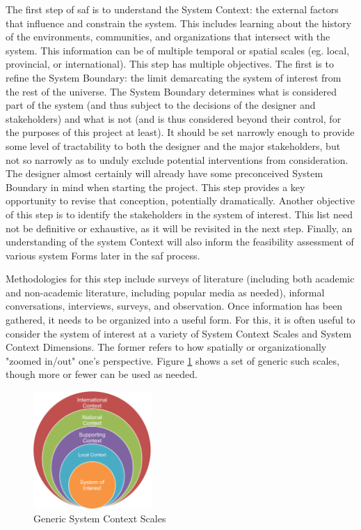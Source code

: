The first step of \ac{saf} is to understand the System Context: the external factors that influence and constrain the system. This includes learning about the history of the environments, communities, and organizations that intersect with the system. This information can be of multiple temporal or spatial scales (eg. local, provincial, or international). This step has multiple objectives. The first is to refine the System Boundary: the limit demarcating the system of interest from the rest of the universe. The System Boundary determines what is considered part of the system (and thus subject to the decisions of the designer and stakeholders) and what is not (and is thus considered beyond their control, for the purposes of this project at least). It should be set narrowly enough to provide some level of tractability to both the designer and the major stakeholders, but not so narrowly as to unduly exclude potential interventions from consideration. The designer almost certainly will already have some preconceived System Boundary in mind when starting the project. This step provides a key opportunity to revise that conception, potentially dramatically. Another objective of this step is to identify the stakeholders in the system of interest. This list need not be definitive or exhaustive, as it will be revisited in the next step. Finally, an understanding of the system Context will also inform the feasibility assessment of various system Forms later in the \ac{saf} process.

Methodologies for this step include surveys of literature (including both academic and non-academic literature, including popular media as needed), informal conversations, interviews, surveys, and observation. Once information has been gathered, it needs to be organized into a useful form. For this, it is often useful to consider the system of interest at a variety of System Context Scales and System Context Dimensions. The former refers to how spatially or organizationally "zoomed in/out" one's perspective. Figure \ref{fig:scale} shows a set of generic such scales, though more or fewer can be used as needed. 

\begin{figure}[!htb] 
\centering
\includegraphics[width=0.4\textwidth]{Figures/chap3/scale.png}
\caption[Generic System Context Scales]{Generic System Context Scales}
\label{fig:scale}
\end{figure}

